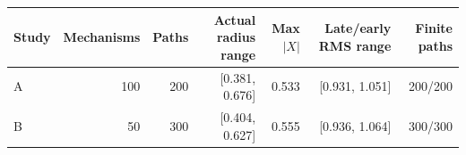 \begin{tabular}{lrrrrrr}
\toprule
Study & Mechanisms & Paths & Actual radius range & Max $|X|$ & Late/early RMS range & Finite paths \\
\midrule
A & 100 & 200 & [0.381, 0.676] & 0.533 & [0.931, 1.051] & 200/200 \\
B & 50 & 300 & [0.404, 0.627] & 0.555 & [0.936, 1.064] & 300/300 \\
\bottomrule
\end{tabular}
